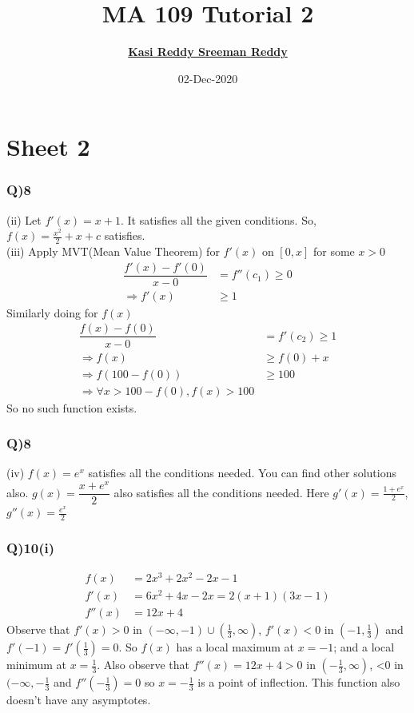 \documentclass[11pt]{beamer}
\author[K. Sreeman Reddy]{\href{http://iamsreeman.github.io/}{\textbf{Kasi Reddy Sreeman Reddy}}\linebreak\text{2nd year physics student}\linebreak\text{\href{http://iamsreeman.github.io/MA109}{http://iamsreeman.github.io/MA109}}}
\title{MA 109 Tutorial 2}
\institute[]{IIT Bombay}
\date{02-Dec-2020}
\begin{document}
\begin{frame}
\titlepage
\end{frame}


\section{Sheet 2}
\begin{frame}
\frametitle{Q)8}
(ii) Let $f'(x)=x+1$. It satisfies all the given conditions. So, $f(x)=\frac{x^2}{2}+x+c$ satisfies.\\
(iii) Apply MVT(Mean Value Theorem) for $f'(x)$ on $[0,x]$ for some $x>0$
\begin{align*}
\dfrac{f'(x)-f'(0)}{x-0}&=f''(c_1)\geq 0\\
\Rightarrow f'(x)&\geq 1
\end{align*}
Similarly doing for $f(x)$
\begin{align*}
\dfrac{f(x)-f(0)}{x-0}&=f'(c_2)\geq 1\\
\Rightarrow f(x)&\geq f(0)+x\\
\Rightarrow f(100-f(0))&\geq 100\\
\Rightarrow \forall x >100-f(0), f(x)>100
\end{align*}
So no such function exists.
\end{frame}
\begin{frame}
\frametitle{Q)8}
(iv) $f(x)=e^x$ satisfies all the conditions needed. You can find other solutions also. $g(x)=\dfrac{x+e^x}{2}$ also satisfies all the conditions needed. Here $g'(x)=\frac{1+e^x}{2}$, $g''(x)=\frac{e^x}{2}$
\end{frame}
\begin{frame}
\frametitle{Q)10(i)}
\begin{align*}
f(x)&=2x^{3}+2x^{2}-2x-1\\
f'(x)&=6x^{2}+4x-2x=2(x+1)(3x-1)\\
f''(x)&=12x+4
\end{align*}
Observe that $f'(x)>0$ in $(-\infty,-1)\cup (\frac{1}{3},\infty)$, $f'(x)<0$ in $(-1,\frac{1}{3})$ and $f'(-1)=f'(\frac{1}{3})=0$. So $f(x)$ has a local maximum at $x = -1$; and a local minimum at $x =\frac{1}{3}$. Also observe that $f''(x) = 12x + 4>0$ in $(-\frac{1}{3},\infty)$, <0 in $(-\infty,-\frac{1}{3}$ and $f''(-\frac{1}{3})=0$ so $x=-\frac{1}{3}$ is a point of inflection. This function also doesn't have any asymptotes.
\end{frame}
\end{document}
